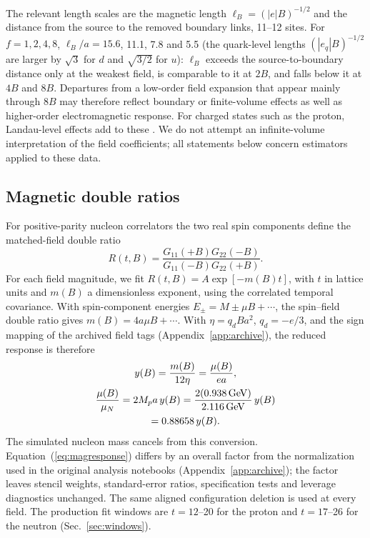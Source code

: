 \documentclass[aps,prd,preprint,nofootinbib,floatfix]{revtex4-2}
\begin{document}
The relevant length scales are the magnetic length $\ell_B=(|e|B)^{-1/2}$ and the distance from the source to the removed boundary links, 11--12 sites. For $f=1,2,4,8$, $\ell_B/a=15.6$, 11.1, 7.8 and 5.5 (the quark-level lengths $(|e_q|B)^{-1/2}$ are larger by $\sqrt3$ for $d$ and $\sqrt{3/2}$ for $u$): $\ell_B$ exceeds the source-to-boundary distance only at the weakest field, is comparable to it at $2B$, and falls below it at $4B$ and $8B$. Departures from a low-order field expansion that appear mainly through $8B$ may therefore reflect boundary or finite-volume effects as well as higher-order electromagnetic response. For charged states such as the proton, Landau-level effects add to these \cite{TiburziVayl2013,Bignell2020Nucleon}. We do not attempt an infinite-volume interpretation of the field coefficients; all statements below concern estimators applied to these data.

\subsection{Magnetic double ratios}

For positive-parity nucleon correlators the two real spin components define the matched-field double ratio
\begin{equation}
R(t,B)=\frac{G_{11}(+B)G_{22}(-B)}{G_{11}(-B)G_{22}(+B)}.
\label{eq:doubleratio}
\end{equation}
For each field magnitude, we fit $R(t,B)=A\exp[-m(B)t]$, with $t$ in lattice units and $m(B)$ a dimensionless exponent, using the correlated temporal covariance. With spin-component energies $E_\pm=M\pm\mu B+\cdots$, the spin--field double ratio gives $m(B)=4a\mu B+\cdots$. With $\eta=q_dBa^2$, $q_d=-e/3$, and the sign mapping of the archived field tags (Appendix~\ref{app:archive}), the reduced response is therefore
\begin{equation}
\begin{gathered}
y(B)=\frac{m(B)}{12\eta}=\frac{\mu(B)}{ea},\\
\frac{\mu(B)}{\mu_N}=2M_p a\,y(B)
=\frac{2(0.938\,{\rm GeV})}{2.116\,{\rm GeV}}\,y(B)\\
=0.88658\,y(B).
\end{gathered}
\label{eq:magresponse}
\end{equation}
The simulated nucleon mass cancels from this conversion. Equation~(\ref{eq:magresponse}) differs by an overall factor from the normalization used in the original analysis notebooks (Appendix~\ref{app:archive}); the factor leaves stencil weights, standard-error ratios, specification tests and leverage diagnostics unchanged. The same aligned configuration deletion is used at every field. The production fit windows are $t=12$--20 for the proton and $t=17$--26 for the neutron (Sec.~\ref{sec:windows}).
\end{document}
